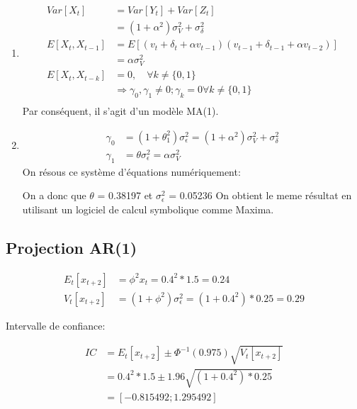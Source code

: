 \documentclass{article}
\begin{document}
\begin{enumerate}
\item 
  \begin{align*}
    Var[X_t] &= Var[Y_t] + Var[Z_t] \\
    &= (1+\alpha^2)\sigma^2_{V} + \sigma^2_{\delta} \\
    E[X_t,X_{t-1}] &= E[(v_t+\delta_t+\alpha v_{t-1})(v_{t-1}+\delta_{t-1}+\alpha v_{t-2})] \\
    &= \alpha \sigma^2_{V} \\
    E[X_t,X_{t-k}] &= 0, \quad\forall k \neq \{ 0,1 \} \\
    &\Rightarrow \gamma_0,\gamma_1 \neq 0; \gamma_k=0 \forall k \neq \{ 0,1 \} \\
  \end{align*}
  Par conséquent, il s'agit d'un modèle MA(1).
\item 
  \begin{align*}
    \gamma_0 &= (1+\theta_1^2) \sigma^2_{\epsilon} = (1+\alpha^2)\sigma^2_{V} + \sigma^2_{\delta} \\
    \gamma_1 &= \theta\sigma^2_{\epsilon} = \alpha\sigma^2_{V}
  \end{align*}
  On résous ce système d'équations numériquement:
  

\begin{Schunk}
\end{Schunk}

On a donc que $\theta$ = 0.38197 et $\sigma^2_{\epsilon}$ = 0.05236
  On obtient le meme résultat en utilisant un logiciel de calcul symbolique comme Maxima.
  \end{enumerate}
  
\subsection{Projection AR(1)}

\begin{align*}
  E_t[x_{t+2}] &= \phi^2 x_t = 0.4^2*1.5 = 0.24 \\
  V_t[x_{t+2}] &= (1+\phi^2)\sigma^2_{\epsilon} = (1+0.4^2)*0.25 = 0.29
\end{align*}

Intervalle de confiance:

\begin{align*}
  IC &= E_t[x_{t+2}] \pm \Phi^{-1}(0.975)\sqrt{V_t[x_{t+2}]} \\
  &= 0.4^2*1.5 \pm 1.96 \sqrt{(1+0.4^2)*0.25} \\
  &= [-0.815492;1.295492]
\end{align*}


\clearpage

\end{document}
